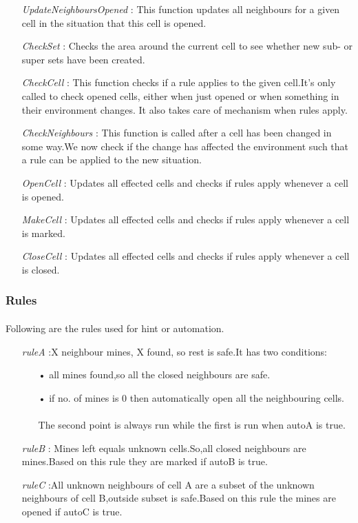 \documentclass[12pt,a4paper]{report}
\begin{document}
\begin{itemize}
\item[]\textit{UpdateNeighboursOpened} : This function updates all neighbours for a given cell in the situation that this cell is opened. 
\item[]\textit{CheckSet} : Checks the area around the current cell to see whether new sub- or super sets have been created.
\item[]\textit{CheckCell} : This function checks if a rule applies to the given cell.It's only called to check opened cells, either when just opened or when something in their environment changes. It also takes care of mechanism when rules apply.
\item[]\textit{CheckNeighbours} : This function is called after a cell has been changed in some way.We now check if the change has affected the environment such that a rule can be applied to the new situation.
\item[]\textit{OpenCell} : Updates all effected cells and checks if rules apply whenever a cell is opened.
\item[]\textit{MakeCell} : Updates all effected cells and checks if rules apply whenever a cell is marked.
\item[]\textit{CloseCell} : Updates all effected cells and checks if rules apply whenever a cell is closed.
\end{itemize}      
\subsubsection*{Rules} 
\paragraph*{}
Following are the rules used for hint or automation.
\begin{itemize}
\item[]\textit{ruleA} :X neighbour mines, X found, so rest is safe.It has two conditions:
\begin{itemize}
\item[•] all mines found,so all the closed neighbours are safe.
\item[•]if no. of mines is 0 then automatically open all the neighbouring cells.
\paragraph*{}
The second point is always run while the first is run when autoA is true.
\end{itemize}
\item[]\textit{ruleB} : Mines left equals unknown cells.So,all closed neighbours are mines.Based on this rule they are marked if autoB is true.
\item[]\textit{ruleC} :All unknown neighbours of cell A are a subset of the unknown neighbours of cell B,outside subset is safe.Based on this rule the mines are opened if autoC is true.
\end{itemize}
\end{document}
